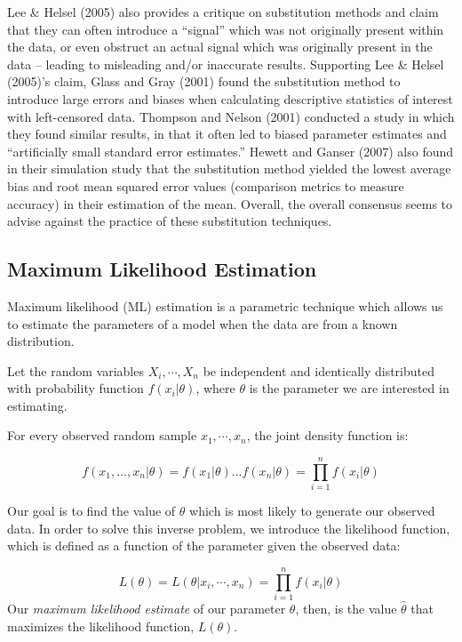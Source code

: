 \documentclass[12pt, twoside]{amherstthesis}
\begin{document}
Lee \& Helsel (2005) also provides a critique on substitution methods and claim that they can often introduce a ``signal'' which was not originally present within the data, or even obstruct an actual signal which was originally present in the data -- leading to misleading and/or inaccurate results. Supporting Lee \& Helsel (2005)'s claim, Glass and Gray (2001) found the substitution method to introduce large errors and biases when calculating descriptive statistics of interest with left-censored data. Thompson and Nelson (2001) conducted a study in which they found similar results, in that it often led to biased parameter estimates and ``artificially small standard error estimates.'' Hewett and Ganser (2007) also found in their simulation study that the substitution method yielded the lowest average bias and root mean squared error values (comparison metrics to measure accuracy) in their estimation of the mean. Overall, the overall consensus seems to advise against the practice of these substitution techniques.

\hypertarget{MLE}{%
\subsection{Maximum Likelihood Estimation}\label{MLE}}

Maximum likelihood (ML) estimation is a parametric technique which allows us to estimate the parameters of a model when the data are from a known distribution.

Let the random variables \(X_i, \cdots, X_n\) be independent and identically distributed with probability function \(f(x_i|\theta)\), where \(\theta\) is the parameter we are interested in estimating.

For every observed random sample \(x_1,\cdots,x_n\), the joint density function is:

\[f(x_1,...,x_n|\theta) = f(x_1|\theta)...f(x_n|\theta) = \prod_{i=1}^{n}f(x_i|\theta)\]

Our goal is to find the value of \(\theta\) which is most likely to generate our observed data. In order to solve this inverse problem, we introduce the likelihood function, which is defined as a function of the parameter given the observed data:

\[L(\theta) = L(\theta|x_i, \cdots, x_n) = \prod_{i=1}^{n}f(x_i|\theta)\]
Our \emph{maximum likelihood estimate} of our parameter \(\theta\), then, is the value \(\hat{\theta}\) that maximizes the likelihood function, \(L(\theta)\).
\end{document}
